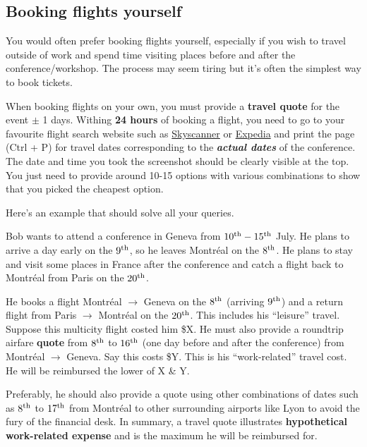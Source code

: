     \subsection*{Booking flights yourself}
    You would often prefer booking flights yourself, especially if you wish to travel outside of work and spend time visiting places before and after the conference/workshop. The process may seem tiring but it's often the simplest way to book tickets. 
    
    When booking flights on your own, you must provide a \textbf{travel quote} for the event $\pm$ 1 days. Withing \textbf{24 hours} of booking a flight, you need to go to your favourite flight search website such as \href{https://www.skyscanner.ca/}{Skyscanner} or \href{https://www.expedia.ca/Flights}{Expedia} and print the page (Ctrl + P) for travel dates corresponding to the \textbf{\textit{actual dates}} of the conference. The date and time you took the screenshot should be clearly visible at the top. You just need to provide around 10-15 options with various combinations to show that you picked the cheapest option. 
    
    Here's an example that should solve all your queries. 

    \begin{plaincorollary}
    Bob wants to attend a conference in Geneva from $10^{\rm th}-15^{\rm th}$ July. He plans to arrive a day early on the $9^{\rm th}$, so he leaves Montr\'eal on the $8^{\rm th}$. He plans to stay and visit some places in France after the conference and catch a flight back to Montr\'eal from Paris on the $20^{\rm th}$. 

    He books a flight Montr\'eal $\rightarrow$ Geneva on the $8^{\rm th}$ (arriving $9^{\rm th}$) and a return flight from Paris $\rightarrow$ Montr\'eal on the $20^{\rm th}$. This includes his ``leisure'' travel. Suppose this multicity flight costed him \$X. He must also provide a roundtrip airfare \textbf{quote} from $8^{\rm th}$ to $16^{\rm th}$ (one day before and after the conference) from Montr\'eal $\rightarrow$ Geneva. Say this costs \$Y. This is his ``work-related'' travel cost. He will be reimbursed the lower of X \& Y.     
    
    Preferably, he should also provide a quote using other combinations of dates such as $8^{\rm th}$ to $17^{\rm th}$ from Montr\'eal to other surrounding airports like Lyon to avoid the fury of the financial desk. In summary, a travel quote illustrates \textbf{hypothetical work-related expense} and is the maximum he will be reimbursed for.    
    \end{plaincorollary}

